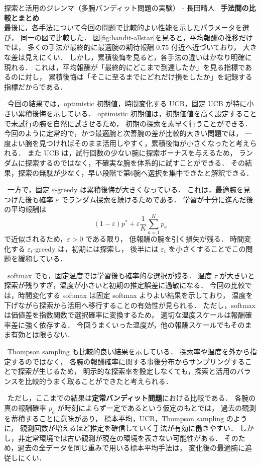 \begin{column}{探索と活用のジレンマ（多腕バンディット問題の実験） - 長田晴人}
\ \textbf{手法間の比較とまとめ}\\
最後に，各手法について今回の問題で比較的よい性能を示したパラメータを選び，
同一の図で比較した．
図\ref{fig:bandit-allstar}を見ると，平均報酬の推移だけでは，
多くの手法が最終的に最適腕の期待報酬 $0.75$ 付近へ近づいており，
大きな差は見えにくい．
しかし，累積後悔を見ると，各手法の違いはかなり明確に現れる．
これは，平均報酬が「最終的にどこまで到達したか」を見る指標であるのに対し，
累積後悔は「そこに至るまでにどれだけ損をしたか」を記録する指標だからである．

\ 今回の結果では，optimistic 初期値，時間変化する UCB，固定 UCB が特に小さい累積後悔を示している．
optimistic 初期値は，初期価値を高く設定することで未試行の腕を自然に試させるため，
初期の探索を素早く行うことができる．
今回のように定常的で，かつ最適腕と次善腕の差が比較的大きい問題では，
一度よい腕を見つければそのまま活用しやすく，累積後悔が小さくなったと考えられる．
また UCB は，試行回数の少ない腕に探索ボーナスを与えるため，
ランダムに探索するのではなく，不確実な腕を体系的に試すことができる．
その結果，探索の無駄が少なく，早い段階で第6腕へ選択を集中できたと解釈できる．

\ 一方で，固定 $\varepsilon$-greedy は累積後悔が大きくなっている．
これは，最適腕を見つけた後も確率 $\varepsilon$ でランダム探索を続けるためである．
学習が十分に進んだ後の平均報酬は
\[
    (1-\varepsilon)p^\ast
    +
    \varepsilon \frac{1}{K}\sum_{a=1}^{K}p_a
\]
で近似されるため，$\varepsilon>0$ である限り，
低報酬の腕を引く損失が残る．
時間変化する $\varepsilon_t$-greedy は，初期には探索し，
後半には $\varepsilon_t$ を小さくすることでこの問題を緩和している．

\ softmax でも，固定温度では学習後も確率的な選択が残る．
温度 $\tau$ が大きいと探索が残りすぎ，温度が小さいと初期の推定誤差に過敏になる．
今回の比較では，時間変化する softmax は固定 softmax よりよい結果を示しており，
温度を下げながら探索から活用へ移行することの有効性が見られる．
ただし，softmax は価値差を指数関数で選択確率に変換するため，
適切な温度スケールは報酬確率差に強く依存する．
今回うまくいった温度が，他の報酬スケールでもそのまま有効とは限らない．

\ Thompson sampling も比較的良い結果を示している．
探索率や温度を外から指定するのではなく，
各腕の報酬確率に関する事後分布からサンプリングすることで探索が生じるため，
明示的な探索率を設定しなくても，探索と活用のバランスを比較的うまく取ることができたと考えられる．

\ ただし，ここまでの結果は\textbf{定常バンディット問題}における比較である．
各腕の真の報酬確率 $p_a$ が時刻によらず一定であるという仮定のもとでは，
過去の観測を蓄積することに意味があり，
標本平均，UCB，Thompson sampling のように，
観測回数が増えるほど推定を確信していく手法が有効に働きやすい．
しかし，非定常環境では古い観測が現在の環境を表さない可能性がある．
そのため，過去の全データを同じ重みで用いる標本平均手法は，
変化後の最適腕に追従しにくい．


\end{column}
